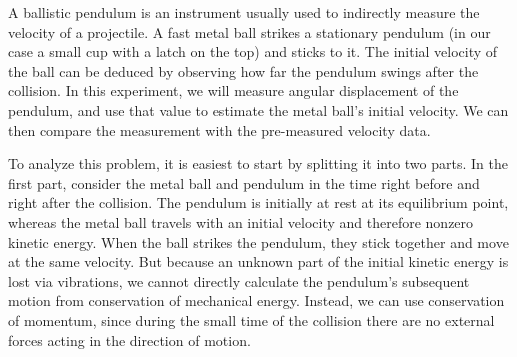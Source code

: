 


A ballistic pendulum is an instrument usually used to indirectly measure the velocity of a projectile. A fast metal ball strikes a stationary pendulum (in our case a small cup with a latch on the top) and sticks to it. The initial velocity of the ball can be deduced by observing how far the pendulum swings after the collision. In this experiment, we will measure angular displacement of the pendulum, and use that value to estimate the metal ball's initial velocity. We can then compare the measurement with the pre-measured velocity data. %

To analyze this problem, it is easiest to start by splitting it into two parts. In the first part, consider the metal ball and pendulum in the time right before and right after the collision. The pendulum is initially at rest at its equilibrium point, whereas the metal ball travels with an initial velocity and therefore nonzero kinetic energy. When the ball strikes the pendulum, they stick together and move at the same velocity. But because an unknown part of the initial kinetic energy is lost via vibrations, we cannot directly calculate the pendulum's subsequent motion from conservation of mechanical energy.  Instead, we can use conservation of momentum, since during the small time of the collision there are no external forces acting in the direction of motion.\myskip
                   

